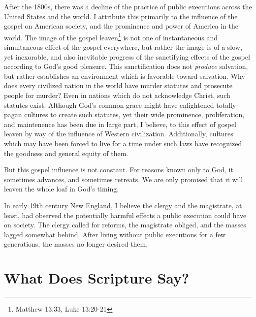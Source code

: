 After the 1800s, there was a decline of the practice of public executions across the United States and the world.  I attribute this primarily to the influence of the gospel on American society, and the prominence and power of America in the world.  The image of the gospel leaven\footnote{Matthew 13:33, Luke 13:20-21} is not one of instantaneous and simultaneous effect of the gospel everywhere, but rather the image is of a slow, yet inexorable, and also inevitable progress of the sanctifying effects of the gospel according to God's good pleasure.  This sanctification does not \textit{produce} salvation, but rather establishes an environment which is favorable toward salvation.  Why does every civilized nation in the world have murder statutes and prosecute people for murder? Even in nations which do not acknowledge Christ, such statutes exist. Although God's common grace might have enlightened totally pagan cultures to create such statutes, yet their wide prominence, proliferation, and maintenence has been due in large part, I believe, to this effect of gospel leaven by way of the influence of Western civilization.  Additionally, cultures which may have been forced to live for a time under such laws have recognized the goodness and general equity of them. 

But this gospel influence is not constant.  For reasons known only to God, it sometimes advances, and sometimes retreats.  We are only promised that it will leaven the whole loaf in God's timing.  

In early 19th century New England, I believe the clergy and the magistrate, at least, had observed the potentially harmful effects a public execution could have on society.  The clergy called for reforms, the magistrate obliged, and the masses lagged somewhat behind.  After living without public executions for a few generations, the masses no longer desired them.

\ifdefined\embedversion\newpage\fi
\section{What Does Scripture Say?}

